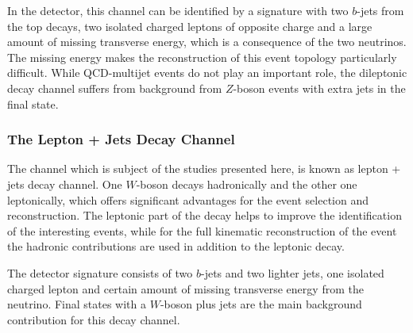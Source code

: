  In the detector, this channel can be identified by a  signature with two $b$-jets from the top decays, two isolated charged leptons of opposite charge and a large amount of missing transverse energy, which is  a consequence of the two neutrinos.
The missing energy makes the reconstruction of this event topology particularly difficult. While QCD-multijet events do not play an important role, the dileptonic decay channel suffers from background from $Z$-boson events with extra jets in the final state.   

\subsubsection{The Lepton + Jets  Decay Channel}
The channel which is subject of the studies presented here, is  known as lepton + jets decay channel. One $W$-boson decays hadronically and  the other one leptonically, which offers significant advantages for the event selection and reconstruction. The leptonic  part of the decay helps to improve the identification of the interesting   events, while for the full kinematic reconstruction of the event the hadronic contributions are used in addition to the leptonic decay. 

 The detector signature consists of two $b$-jets and two lighter jets, one isolated charged lepton and certain amount of missing transverse energy from the neutrino. Final states with a $W$-boson plus jets are the main background contribution for this decay channel.   
  

 
 \vspace{0.5cm} 
  
  
  
  
  
  
  
  
  
